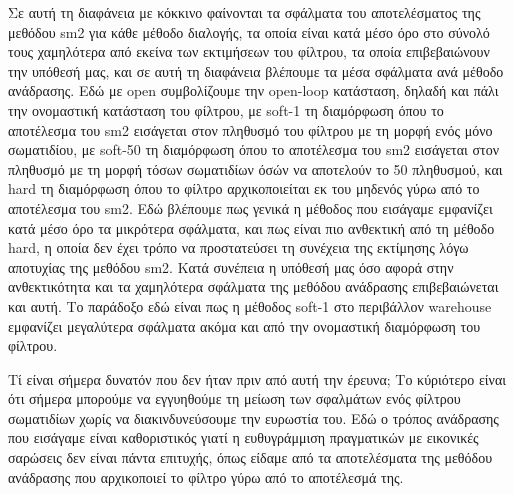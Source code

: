 \documentclass[a4paper,10pt]{article}
\begin{document}
Σε αυτή τη διαφάνεια με κόκκινο φαίνονται τα σφάλματα του αποτελέσματος της
μεθόδου sm2 για κάθε μέθοδο διαλογής, τα οποία είναι κατά μέσο όρο στο σύνολό
τους χαμηλότερα από εκείνα των εκτιμήσεων του φίλτρου, τα οποία επιβεβαιώνουν
την υπόθεσή μας, και σε αυτή τη διαφάνεια βλέπουμε τα μέσα σφάλματα ανά μέθοδο
ανάδρασης. Εδώ με open συμβολίζουμε την open-loop κατάσταση, δηλαδή και πάλι
την ονομαστική κατάσταση του φίλτρου, με soft-1 τη διαμόρφωση όπου το
αποτέλεσμα του sm2 εισάγεται στον πληθυσμό του φίλτρου με τη μορφή ενός μόνο
σωματιδίου, με soft-50 τη διαμόρφωση όπου το αποτέλεσμα του sm2 εισάγεται στον
πληθυσμό με τη μορφή τόσων σωματιδίων όσών να αποτελούν το 50%
πληθυσμού, και hard τη διαμόρφωση όπου το φίλτρο αρχικοποιείται εκ του μηδενός
γύρω από το αποτέλεσμα του sm2. Εδώ βλέπουμε πως γενικά η μέθοδος που εισάγαμε
εμφανίζει κατά μέσο όρο τα μικρότερα σφάλματα, και πως είναι πιο ανθεκτική από
τη μέθοδο hard, η οποία δεν έχει τρόπο να προστατεύσει τη συνέχεια της
εκτίμησης λόγω αποτυχίας της μεθόδου sm2.  Κατά συνέπεια η υπόθεσή μας όσο
αφορά στην ανθεκτικότητα και τα χαμηλότερα σφάλματα της μεθόδου ανάδρασης
επιβεβαιώνεται και αυτή.  Το παράδοξο εδώ είναι πως η μέθοδος soft-1 στο
περιβάλλον warehouse εμφανίζει μεγαλύτερα σφάλματα ακόμα και από την ονομαστική
διαμόρφωση του φίλτρου.

Τί είναι σήμερα δυνατόν που δεν ήταν πριν από αυτή την έρευνα; Το κύριότερο
είναι ότι σήμερα μπορούμε να εγγυηθούμε τη μείωση των σφαλμάτων ενός φίλτρου
σωματιδίων χωρίς να διακινδυνεύσουμε την ευρωστία του. Εδώ ο τρόπος ανάδρασης
που εισάγαμε είναι καθοριστικός γιατί η ευθυγράμμιση πραγματικών με εικονικές
σαρώσεις δεν είναι πάντα επιτυχής, όπως είδαμε από τα αποτελέσματα της μεθόδου
ανάδρασης που αρχικοποιεί το φίλτρο γύρω από το αποτέλεσμά της.
\end{document}
